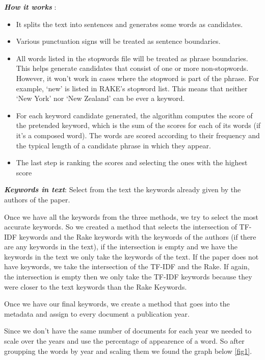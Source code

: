 \documentclass[article,twocolumn]{IEEEtran}
\providecommand{\tightlist}{%
      \setlength{\itemsep}{0pt}\setlength{\parskip}{0pt}}
\begin{document}
\textbf{\emph{How it works}} :

\begin{itemize}
\tightlist
\item
  It splits the text into sentences and generates some words as
  candidates.\\
\item
  Various punctuation signs will be treated as sentence boundaries.
\item
  All words listed in the stopwords file will be treated as phrase
  boundaries. This helps generate candidates that consist of one or more
  non-stopwords. However, it won't work in cases where the stopword is
  part of the phrase. For example, `new' is listed in RAKE's stopword
  list. This means that neither `New York' nor `New Zealand' can be ever
  a keyword.
\item
  For each keyword candidate generated, the algorithm computes the score
  of the pretended keyword, which is the sum of the scores for each of
  its words (if it's a composed word). The words are scored according to
  their frequency and the typical length of a candidate phrase in which
  they appear.
\item
  The last step is ranking the scores and selecting the ones with the
  highest score
\end{itemize}

    \textbf{\emph{Keywords in text}}: Select from the text the keywords
already given by the authors of the paper.

    Once we have all the keywords from the three methods, we try to select
the most accurate keywords. So we created a method that selects the
intersection of TF-IDF keywords and the Rake keywords with the keywords
of the authors (if there are any keywords in the text), if the
intersection is empty and we have the keywords in the text we only take
the keywords of the text. If the paper does not have keywords, we take
the intersection of the TF-IDF and the Rake. If again, the intersection
is empty then we only take the TF-IDF keywords because they were closer
to the text keywords than the Rake Keywords.

    Once we have our final keywords, we create a method that goes into the
metadata and assign to every document a publication year.


    Since we don't have the same number of documents for each year we needed
to scale over the years and use the percentage of appearence of a word.
So after groupping the words by year and scaling them we found the graph
below \ref{fig1}.
\end{document}

